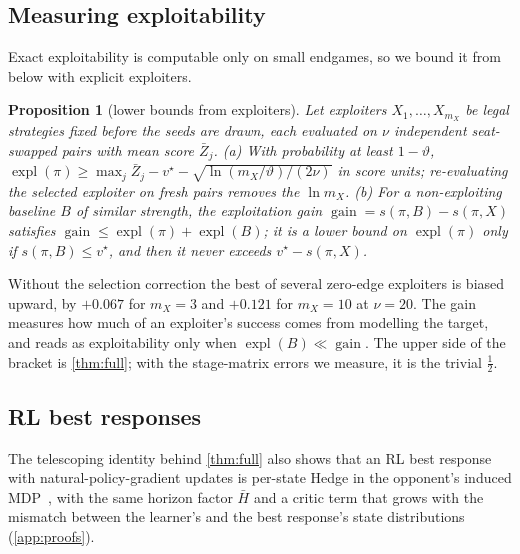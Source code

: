 \documentclass[10pt]{article}
\theoremstyle{plain}
\newtheorem{proposition}[theorem]{Proposition}
\theoremstyle{definition}
\theoremstyle{remark}
\newcommand{\Hbar}{\bar H}
\DeclareMathOperator{\expl}{expl}
\DeclareMathOperator{\gain}{gain}
\begin{document}
\subsection{Measuring exploitability}
\label{sec:measure}
Exact exploitability is computable only on small endgames, so we bound it from below with explicit exploiters.
\begin{proposition}[lower bounds from exploiters]\label{prop:R5}
Let exploiters $X_1,\dots,X_{m_X}$ be legal strategies fixed before the seeds are drawn, each evaluated on $\nu$ independent seat-swapped pairs with mean score $\bar Z_j$. (a) With probability at least $1-\vartheta$, $\expl(\pi)\ge\max_j\bar Z_j-v^\star-\sqrt{\ln(m_X/\vartheta)/(2\nu)}$ in score units; re-evaluating the selected exploiter on fresh pairs removes the $\ln m_X$. (b) For a non-exploiting baseline $B$ of similar strength, the exploitation gain $\gain=s(\pi,B)-s(\pi,X)$ satisfies $\gain\le\expl(\pi)+\expl(B)$; it is a lower bound on $\expl(\pi)$ only if $s(\pi,B)\le v^\star$, and then it never exceeds $v^\star-s(\pi,X)$.
\end{proposition}
Without the selection correction the best of several zero-edge exploiters is biased upward, by $+0.067$ for $m_X=3$ and $+0.121$ for $m_X=10$ at $\nu=20$. The gain measures how much of an exploiter's success comes from modelling the target, and reads as exploitability only when $\expl(B)\ll\gain$. The upper side of the bracket is \cref{thm:full}; with the stage-matrix errors we measure, it is the trivial $\frac12$.

\subsection{RL best responses}
The telescoping identity behind \cref{thm:full} also shows that an RL best response with natural-policy-gradient updates is per-state Hedge in the opponent's induced MDP~\cite{Aga21}, with the same horizon factor $\Hbar$ and a critic term that grows with the mismatch between the learner's and the best response's state distributions (\cref{app:proofs}).
\end{document}
